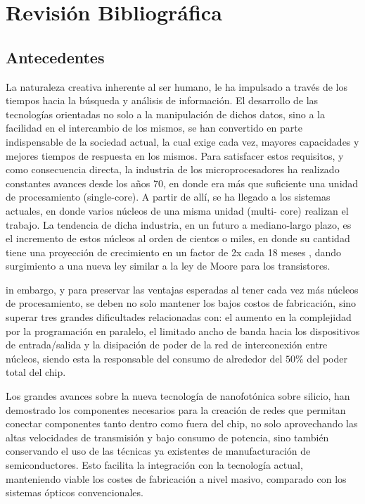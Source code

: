 \section{Revisión Bibliográfica}
\subsection*{Antecedentes}
La naturaleza creativa inherente al ser humano, le ha impulsado a través de los tiempos
hacia la búsqueda y análisis de información. El desarrollo de las tecnologías orientadas
no solo a la manipulación de dichos datos, sino a la facilidad en el intercambio de los
mismos, se han convertido en parte indispensable de la sociedad actual, la cual exige
cada vez, mayores capacidades y mejores tiempos de respuesta en los mismos.
Para satisfacer estos requisitos, y como consecuencia directa, la industria de los
microprocesadores ha realizado constantes avances desde los años 70, en donde era
más que suficiente una unidad de procesamiento (single-core). A partir de allí, se ha
llegado a los sistemas actuales, en donde varios núcleos de una misma unidad (multi-
core) realizan el trabajo. La tendencia de dicha industria, en un futuro a mediano-largo
plazo, es el incremento de estos núcleos al orden de cientos o miles, en donde su
cantidad tiene una proyección de crecimiento en un factor de 2x cada 18 meses \cite{Magen2004},
dando surgimiento a una nueva ley similar a la ley de Moore para los transistores.

in embargo, y para preservar las ventajas esperadas al tener cada vez más núcleos de
procesamiento, se deben no solo mantener los bajos costos de fabricación, sino superar
tres grandes dificultades \cite{Asanovic2007} relacionadas con: el aumento en la 
complejidad por la programación en paralelo, el limitado ancho de banda hacia los dispositivos de
entrada/salida y la disipación de poder de la red de interconexión entre núcleos, siendo
esta la responsable del consumo de alrededor del $50\%$ \cite{Bergman2007} del 
poder total del chip.

Los grandes avances sobre la nueva tecnología de nanofotónica sobre silicio, han
demostrado los componentes necesarios \cite{Chan2011} para la creación de redes que permitan
conectar componentes tanto dentro como fuera del chip, no solo aprovechando las
altas velocidades de transmisión y bajo consumo de potencia, sino también
conservando el uso de las técnicas ya existentes de manufacturación de
semiconductores. Esto facilita la integración con la tecnología actual, manteniendo
viable los costes de fabricación a nivel masivo, comparado con los sistemas ópticos
convencionales.


